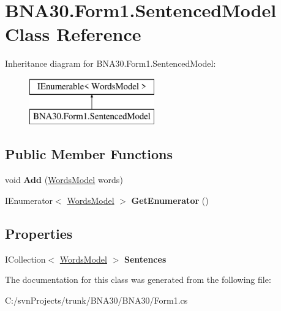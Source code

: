\hypertarget{class_b_n_a30_1_1_form1_1_1_sentenced_model}{}\section{B\+N\+A30.\+Form1.\+Sentenced\+Model Class Reference}
\label{class_b_n_a30_1_1_form1_1_1_sentenced_model}
Inheritance diagram for B\+N\+A30.\+Form1.\+Sentenced\+Model\+:\begin{figure}[H]
\begin{center}
\leavevmode
\includegraphics[height=2.000000cm]{class_b_n_a30_1_1_form1_1_1_sentenced_model}
\end{center}
\end{figure}
\subsection*{Public Member Functions}
\begin{DoxyCompactItemize}
\item 
\mbox{\label{class_b_n_a30_1_1_form1_1_1_sentenced_model_a721a850961833d6b2897d0c742714ff7}} 
void {\bfseries Add} (\mbox{\hyperlink{class_b_n_a30_1_1_form1_1_1_words_model}{Words\+Model}} words)
\item 
\mbox{\label{class_b_n_a30_1_1_form1_1_1_sentenced_model_acb444d65a53fc24377c8c702a310ddad}} 
I\+Enumerator$<$ \mbox{\hyperlink{class_b_n_a30_1_1_form1_1_1_words_model}{Words\+Model}} $>$ {\bfseries Get\+Enumerator} ()
\end{DoxyCompactItemize}
\subsection*{Properties}
\begin{DoxyCompactItemize}
\item 
\mbox{\label{class_b_n_a30_1_1_form1_1_1_sentenced_model_ab00968705c40957d2cd67ec586af7fec}} 
I\+Collection$<$ \mbox{\hyperlink{class_b_n_a30_1_1_form1_1_1_words_model}{Words\+Model}} $>$ {\bfseries Sentences}
\end{DoxyCompactItemize}


The documentation for this class was generated from the following file\+:\begin{DoxyCompactItemize}
\item 
C\+:/svn\+Projects/trunk/\+B\+N\+A30/\+B\+N\+A30/Form1.\+cs\end{DoxyCompactItemize}
